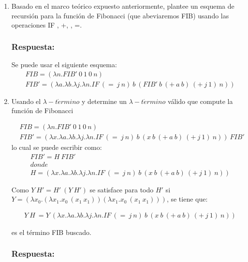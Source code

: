 \documentclass{article}
\begin{document}
\begin{enumerate}

\item Basado en el marco teórico expuesto anteriormente, plantee un esquema de recursión para la función de Fibonacci (que abeviaremos FIB) usando las operaciones IF , +, \textasteriskcentered, =.

\subsubsection*{Respuesta:}
Se puede usar el siguiente esquema:
\begin{align*}
&FIB=(\lambda n . FIB'\ 0\ 1\ 0\ n)
\\&FIB'=(\lambda a . \lambda b . \lambda j . \lambda n . IF\ (=\ j\ n)\ b\ (FIB'\ b\ (+\ a\ b)\ (+\ j\ 1)\ n))
\end{align*}




\item Usando el $\lambda-t \acute ermino$ y determine un $\lambda-t \acute ermino$ válido que compute la función de Fibonacci

\begin{align*}
&FIB=(\lambda n . FIB'\ 0\ 1\ 0\ n)
\\&FIB'=(\lambda x . \lambda a . \lambda b . \lambda j . \lambda n . IF\ (=\ j\ n)\ b\ (x\ b\ (+\ a\ b)\ (+\ j\ 1)\ n))\ FIB'
\end{align*}
lo cual se puede escribir como:
\begin{align*}
&FIB'=H\ FIB'
\\&donde
\\& H=(\lambda x . \lambda a . \lambda b . \lambda j . \lambda n . IF\ (=\ j\ n)\ b\ (x\ b\ (+\ a\ b)\ (+\ j\ 1)\ n))
\end{align*}

Como $Y\ H' = H'\ (Y\ H')$ se satisface para todo $H'$ si $Y=(\lambda x_0 . (\lambda x_1 . x_0\ (x_1\ x_1))(\lambda x_1 . x_0\ (x_1\ x_1)))$, se tiene que:

\begin{align*}
&Y\ H\ = Y\ (\lambda x . \lambda a . \lambda b . \lambda j . \lambda n . IF\ (=\ j\ n)\ b\ (x\ b\ (+\ a\ b)\ (+\ j\ 1)\ n))
\end{align*}

es el término FIB buscado.

\subsubsection*{Respuesta:}



\end{enumerate}
\end{document}
